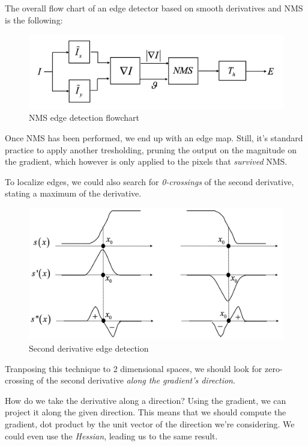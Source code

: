 \documentclass{article}
\begin{document}
The overall flow chart of an edge detector based on smooth derivatives
and NMS is the following:

\begin{figure}
\centering
\includegraphics{./res/nms-edge-detection.png}
\caption{NMS edge detection flowchart}
\end{figure}

Once NMS has been performed, we end up with an edge map. Still, it's
standard practice to apply another tresholding, pruning the output on
the magnitude on the gradient, which however is only applied to the
pixels that \emph{survived} NMS.

To localize edges, we could also search for \emph{0-crossings} of the
second derivative, stating a maximum of the derivative.

\begin{figure}
\centering
\includegraphics{./res/second-derivative.png}
\caption{Second derivative edge detection}
\end{figure}

Tranposing this technique to 2 dimensional spaces, we should look for
zero-crossing of the second derivative \emph{along the gradient's
direction}.

How do we take the derivative along a direction? Using the gradient, we
can project it along the given direction. This means that we should
compute the gradient, dot product by the unit vector of the direction
we're considering. We could even use the \emph{Hessian}, leading us to
the same result.
\end{document}
